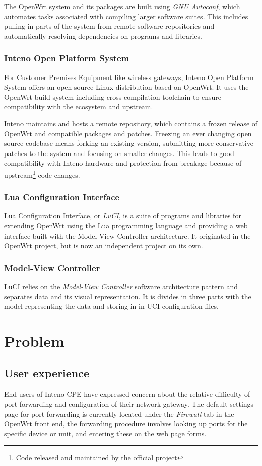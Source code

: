 \documentclass[a4paper,11pt,makeidx]{kth-bcs}
\begin{document}
The OpenWrt system and its packages are built using \emph{GNU Autoconf}, which automates tasks associated with compiling larger software suites.
This includes pulling in parts of the system from remote software repositories and automatically resolving dependencies on programs and libraries.

\subsection{Inteno Open Platform System}
For Customer Premises Equipment like wireless gateways, Inteno Open Platform System offers an open-source Linux distribution based on OpenWrt.
It uses the OpenWrt build system including cross-compilation toolchain to ensure compatibility with the ecosystem and upstream.

Inteno maintains and hosts a remote repository, which contains a frozen release of OpenWrt and compatible packages and patches.
Freezing an ever changing open source codebase means forking an existing version, submitting more conservative patches to the system and focusing on smaller changes.
This leads to good compatibility with Inteno hardware and protection from breakage because of upstream\footnote{Code released and maintained by the official project} code changes.

\subsection{Lua Configuration Interface}\label{sec:LuCI}
Lua Configuration Interface, or \emph{LuCI}, is a suite of programs and libraries for extending OpenWrt using the Lua programming language and providing a web interface built with the Model-View Controller architecture.
It originated in the OpenWrt project, but is now an independent project on its own.

\subsection{Model-View Controller}
LuCI relies on the \emph{Model-View Controller} software architecture pattern and separates data and its visual representation.
It is divides in three parts with the model representing the data and storing in in UCI configuration files.

\chapter{Problem}
   \section{User experience}
End users of Inteno CPE have expressed concern about the relative difficulty of port forwarding and configuration of their network gateway.
The default settings page for port forwarding is currently located under the \emph{Firewall} tab in the OpenWrt front end, the forwarding procedure involves looking up ports for the specific device or unit, and entering these on the web page forms.
\end{document}

